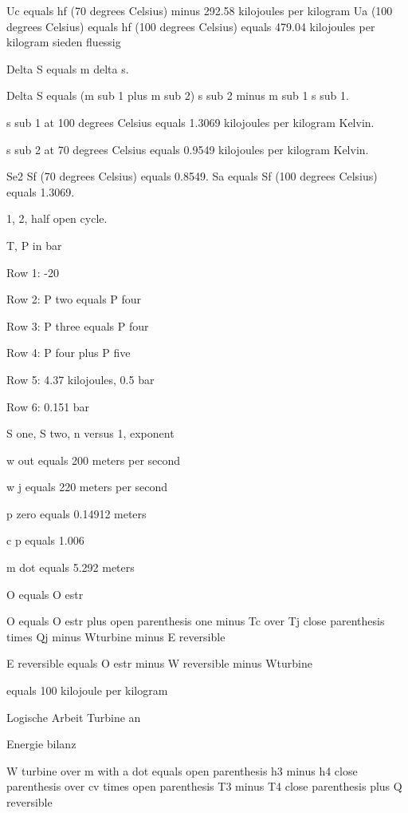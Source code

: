Uc equals hf (70 degrees Celsius) minus 292.58 kilojoules per kilogram  
Ua (100 degrees Celsius) equals hf (100 degrees Celsius) equals 479.04 kilojoules per kilogram  
sieden fluessig

Delta S equals m delta s.

Delta S equals (m sub 1 plus m sub 2) s sub 2 minus m sub 1 s sub 1.

s sub 1 at 100 degrees Celsius equals 1.3069 kilojoules per kilogram Kelvin.

s sub 2 at 70 degrees Celsius equals 0.9549 kilojoules per kilogram Kelvin.

Se2 Sf (70 degrees Celsius) equals 0.8549.
Sa equals Sf (100 degrees Celsius) equals 1.3069.

1, 2, half open cycle.

T, P in bar

Row 1: -20

Row 2: P two equals P four

Row 3: P three equals P four

Row 4: P four plus P five

Row 5: 4.37 kilojoules, 0.5 bar

Row 6: 0.151 bar

S one, S two, n versus 1, exponent

w out equals 200 meters per second

w j equals 220 meters per second

p zero equals 0.14912 meters

c p equals 1.006

m dot equals 5.292 meters

O equals O estr

O equals O estr plus open parenthesis one minus Tc over Tj close parenthesis times Qj minus Wturbine minus E reversible

E reversible equals O estr minus W reversible minus Wturbine

equals 100 kilojoule per kilogram

Logische Arbeit Turbine an

Energie bilanz

W turbine over m with a dot equals open parenthesis h3 minus h4 close parenthesis over cv times open parenthesis T3 minus T4 close parenthesis plus Q reversible
